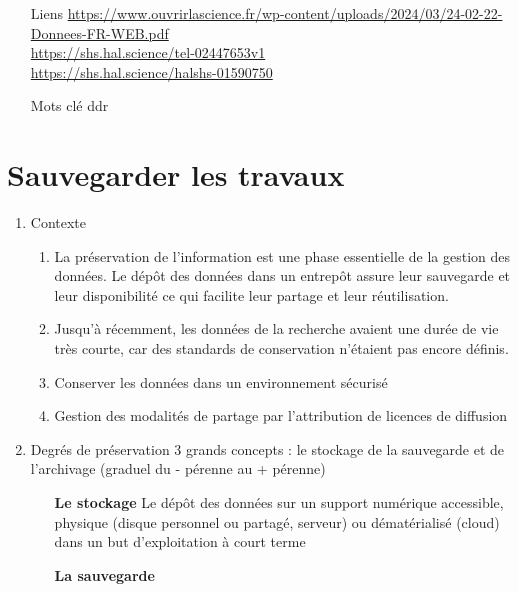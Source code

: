 \documentclass{book}
\begin{document}
\begin{itemize}
    \item [Liens]
        \url{https://www.ouvrirlascience.fr/wp-content/uploads/2024/03/24-02-22-Donnees-FR-WEB.pdf}\\
        \url{https://shs.hal.science/tel-02447653v1}\\
        \url{https://shs.hal.science/halshs-01590750}\\
    \item [Mots clé]
        \gls{ddr}
\end{itemize}


\section{Sauvegarder les travaux}

\begin{enumerate}
    \item Contexte
        \begin{enumerate}
            \item La préservation de l'information est une phase essentielle de la gestion des données. Le dépôt des données dans un entrepôt assure leur sauvegarde et leur disponibilité ce qui facilite leur partage et leur réutilisation.
            \item Jusqu'à récemment, les données de la recherche avaient une durée de vie très courte, car des standards de conservation n'étaient pas encore définis.
            \item Conserver les données dans un environnement sécurisé
            \item Gestion des modalités de partage par l'attribution de licences de diffusion
        \end{enumerate}
	\item Degrés de préservation
     3 grands concepts :  le stockage de la sauvegarde et de l'archivage (graduel du - pérenne au + pérenne)
            \begin{itemize}
                \item [\textbf{Le stockage}]
                Le dépôt des données sur un support numérique accessible, physique (disque personnel ou partagé, serveur) ou dématérialisé (cloud) dans un but d'exploitation à court terme
                \begin{center}
                \big\downarrow    
                \end{center}
                \item [\textbf{La sauvegarde}]

\end{itemize}
\end{enumerate}
\end{document}
